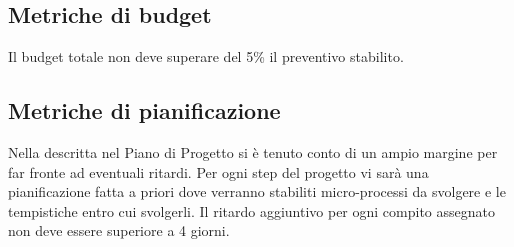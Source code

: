\documentclass[../piano_di_qualifica.tex]{subfiles}
\begin{document}
\subsection{Metriche di budget}%
\label{sub:metr_bud}
Il budget totale non deve superare del 5\% il preventivo stabilito.

\subsection{Metriche di pianificazione} %
\label{sub: metr_pianif}
Nella  descritta nel Piano di Progetto si è tenuto conto di un ampio margine per far fronte ad eventuali ritardi. Per ogni step del progetto vi sarà una pianificazione fatta a priori dove verranno stabiliti micro-processi da svolgere e le tempistiche entro cui svolgerli. Il ritardo aggiuntivo per ogni compito assegnato non deve essere superiore a 4 giorni. 

\end{document}
